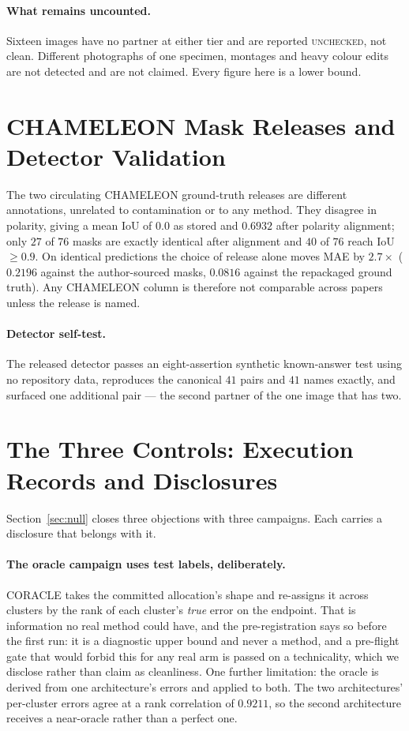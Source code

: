 \documentclass{article} %
\begin{document}
\paragraph{What remains uncounted.} Sixteen images have no partner at either tier and are reported
\textsc{unchecked}, not clean. Different photographs of one specimen, montages and heavy colour edits
are not detected and are not claimed. Every figure here is a lower bound.


\section{CHAMELEON Mask Releases and Detector Validation}
\label{app:masks}

The two circulating CHAMELEON ground-truth releases are different annotations, unrelated to
contamination or to any method. They disagree in polarity, giving a mean IoU of $0.0$ as stored and
$0.6932$ after polarity alignment; only $27$ of $76$ masks are exactly identical after alignment and
$40$ of $76$ reach IoU $\geq 0.9$. On identical predictions the choice of release alone moves MAE by
$2.7\times$ ($0.2196$ against the author-sourced masks, $0.0816$ against the repackaged ground truth).
Any CHAMELEON column is therefore not comparable across papers unless the release is named.

\paragraph{Detector self-test.} The released detector passes an eight-assertion synthetic
known-answer test using no repository data, reproduces the canonical $41$ pairs and $41$ names
exactly, and surfaced one additional pair --- the second partner of the one image that has two.

\section{The Three Controls: Execution Records and Disclosures}
\label{app:controls}

Section~\ref{sec:null} closes three objections with three campaigns. Each carries a disclosure that
belongs with it.

\paragraph{The oracle campaign uses test labels, deliberately.} CORACLE takes the committed
allocation's shape and re-assigns it across clusters by the rank of each cluster's \emph{true} error
on the endpoint. That is information no real method could have, and the pre-registration says so
before the first run: it is a diagnostic upper bound and never a method, and a pre-flight gate that
would forbid this for any real arm is passed on a technicality, which we disclose rather than claim
as cleanliness. One further limitation: the oracle is derived from one architecture's errors and
applied to both. The two architectures' per-cluster errors agree at a rank correlation of $0.9211$,
so the second architecture receives a near-oracle rather than a perfect one.
\end{document}
